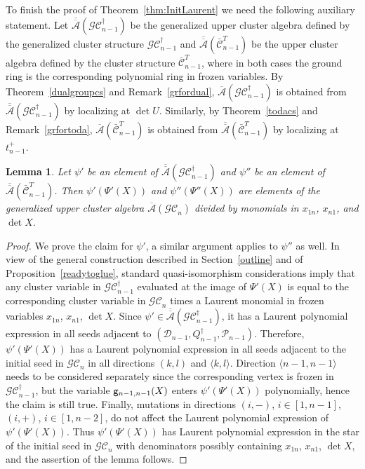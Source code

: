\documentclass{amsart}
\newtheorem{lemma}[theorem]{Lemma}
\theoremstyle{definition}
\theoremstyle{remark}
\numberwithin{equation}{section}
\numberwithin{theorem}{section}
\def\A{{\mathcal A}}
\def\CC{{\mathcal C}}
\def\DD{{\mathcal D}}
\def\G{{\mathcal G}}
\def\GCC{{\G\CC}}
\def\P{{\mathcal P}}
\def\UC{\overline{\A}}
\def\eg{{\tt g}}
\begin{document}
To finish the proof of Theorem~\ref{thm:InitLaurent} we need the following auxiliary statement. 
Let $\overline{\UC}(\GCC_{n-1}^\dag)$ be the generalized upper cluster algebra defined by the generalized cluster structure $\GCC_{n-1}^\dag$ and $\overline{\UC}(\bar\CC_{n-1}^T)$ be the  upper cluster algebra defined by the cluster structure 
$\bar\CC_{n-1}^T$, where in both cases the ground ring is the corresponding polynomial ring in frozen variables. 
By Theorem~\ref{dualgroupcs} and Remark~\ref{grfordual}, $\UC(\GCC_{n-1}^\dag)$ is obtained from 
$\overline{\UC}(\GCC_{n-1}^\dag)$ by localizing at $\det U$. Similarly, by Theorem~\ref{todacs} and Remark~\ref{grfortoda}, $\UC(\bar\CC_{n-1}^T)$ is obtained from $\overline{\UC}(\bar\CC_{n-1}^T)$ by localizing at $t_{n-1}^+$. 

\begin{lemma}
\label{lem:upperalgebras}
Let $\psi'$ be an element of $\overline{\UC}(\GCC_{n-1}^\dag)$ and $\psi''$ be an element of $\overline{\UC}(\bar\CC_{n-1}^T)$. Then $\psi'(\Psi'(X))$ and $\psi''(\Psi''(X))$ are elements of the generalized upper cluster algebra $\UC(\GCC_n)$ divided by monomials in $x_{1n}$, $x_{n1}$, and $\det X$.
\end{lemma}

\begin{proof} We prove the claim for $\psi'$, a similar argument applies to $\psi''$ as well. In view of the general construction described in Section~\ref{outline} and of Proposition~\ref{readytoglue}, standard quasi-isomorphism  considerations imply that any cluster variable in $\GCC_{n-1}^\dag$ 
evaluated at the image of $\Psi'(X)$ is equal to the corresponding cluster variable in $\GCC_n$ times a Laurent monomial in frozen variables $x_{1n}$, $x_{n1}$, $\det X$. Since $\psi'\in \overline{\UC}(\GCC_{n-1}^\dag)$, it has a Laurent polynomial expression in all seeds adjacent to $(\DD_{n-1},Q_{n-1}^\dag, \P_{n-1})$. Therefore, $\psi'(\Psi'(X))$ has a Laurent polynomial expression in all seeds adjacent to the initial seed in $\GCC_n$ in all directions $(k,l)$ and $\langle k,l\rangle$. Direction $\langle n-1,n-1\rangle$ needs to be considered separately since the corresponding vertex is frozen in 
$\GCC_{n-1}^\dag$, but the variable $\eg_{n-1,n-1}(X)$ enters $\psi'(\Psi'(X))$ polynomially, hence the claim is still true. Finally, mutations in directions $(i,-)$, $i\in[1,n-1]$, $(i,+)$, $i\in[1, n-2]$, do not affect the Laurent polynomial expression of $\psi'(\Psi'(X))$. Thus $\psi'(\Psi'(X))$ has Laurent polynomial expression in the star of the initial seed in $\GCC_n$ with denominators possibly containing $x_{1n}$, $x_{n1}$, $\det X$, and the assertion of the lemma follows.
\end{proof}
\end{document}
